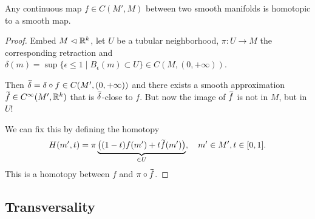 \begin{thm}\label{thm whitney approx}
Any continuous map $f\in C(M',M)$ between two smooth manifolds is homotopic to a smooth map.
\end{thm}
\begin{proof}
Embed $M\vartriangleleft \mathbb{R}^k$, let $U$ be a tubular neighborhood, $\pi:U\to M$ the corresponding retraction and $\delta(m)=\sup \{\epsilon\leq 1\mid B_\epsilon (m)\subset U\}\in C(M,(0,+\infty))$. 

Then $\wt{\delta}=\delta\circ f\in C(M',(0,+\infty))$ and there exists a smooth approximation $\wt{f}\in C^\infty(M',\bbR^k)$ that is $\wt{\delta}$-close to $f$. But now the image of $\wt{f}$ is not in $M$, but in $U$!

We can fix this by defining the homotopy 
\[H(m',t)=\pi\underbrace{\left((1-t)f(m')+t\wt{f}(m')\right)}_{\in U},\quad m'\in M',t\in [0,1].\] This is a homotopy between $f$ and $\pi\circ\wt{f}$.
\end{proof}





\subsection{Transversality}

